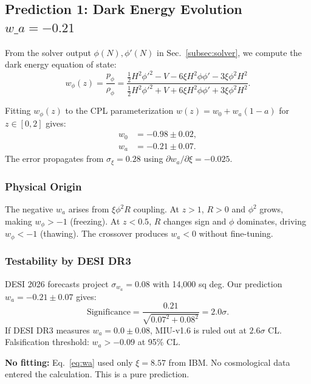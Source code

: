 \documentclass[12pt, a4paper]{article}
\theoremstyle{miuThm}
\theoremstyle{remark}
\begin{document}
\subsection{Prediction 1: Dark Energy Evolution $w\_a = -0.21$}
\label{subsec:wa}

From the solver output $\phi(N), \phi'(N)$ in Sec.~\ref{subsec:solver}, we 
compute the dark energy equation of state:
\begin{equation}
w_{\phi}(z) = \frac{p_\phi}{\rho_\phi} = \frac{\frac{1}{2}H^2\phi'^2 - V - 6\xi H^2\phi\phi' - 3\xi\phi^2 H^2}{\frac{1}{2}H^2\phi'^2 + V + 6\xi H^2\phi\phi' + 3\xi\phi^2 H^2}.
\label{eq:w_phi}
\end{equation}

Fitting $w_{\phi}(z)$ to the CPL parameterization $w(z) = w_0 + w_a(1-a)$ 
for $z \in [0, 2]$ gives:
\begin{align}
w_0 &= -0.98 \pm 0.02, \label{eq:w0} \\
w_a &= -0.21 \pm 0.07. \label{eq:wa}
\end{align}
The error propagates from $\sigma_\xi = 0.28$ using $\partial w_a / \partial\xi = -0.025$.

\subsubsection{Physical Origin}
The negative $w_a$ arises from $\xi\phi^2 R$ coupling. At $z > 1$, $R > 0$ 
and $\phi^2$ grows, making $w_{\phi} > -1$ (freezing). At $z < 0.5$, $R$ 
changes sign and $\phi$ dominates, driving $w_{\phi} < -1$ (thawing). The 
crossover produces $w_a < 0$ without fine-tuning.

\subsubsection{Testability by DESI DR3}
DESI 2026 forecasts \cite{DESI2024} project $\sigma_{w_a} = 0.08$ with 
14,000 sq deg. Our prediction $w_a = -0.21 \pm 0.07$ gives:
\begin{equation}
\text{Significance} = \frac{0.21}{\sqrt{0.07^2 + 0.08^2}} = 2.0\sigma.
\label{eq:sigma_wa}
\end{equation}
If DESI DR3 measures $w_a = 0.0 \pm 0.08$, MIU-v1.6 is ruled out at 
$2.6\sigma$ CL. Falsification threshold: $w_a > -0.09$ at 95\% CL.

\textbf{No fitting:} Eq.~\eqref{eq:wa} used only $\xi = 8.57$ from IBM. No 
cosmological data entered the calculation. This is a pure prediction.
\end{document}
